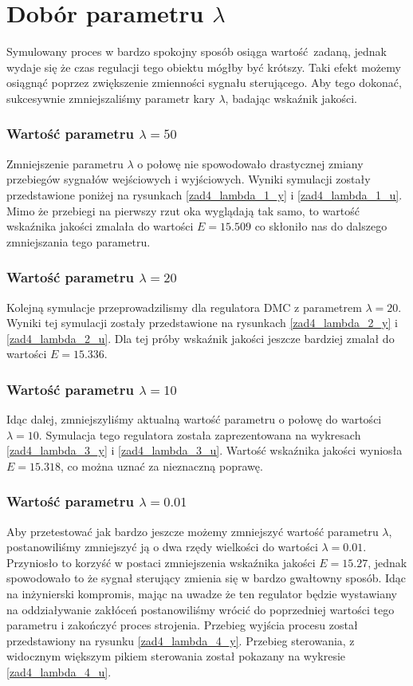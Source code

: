 \section{Dobór parametru $\lambda$}
Symulowany proces w bardzo spokojny sposób osiąga wartość zadaną, jednak wydaje się że czas regulacji
tego obiektu mógłby być krótszy. Taki efekt możemy osiągnąć poprzez zwiększenie zmienności
sygnału sterującego. Aby tego dokonać, sukcesywnie zmniejszaliśmy parametr kary $\lambda$, 
badając wskaźnik jakości.

\subsubsection{Wartość parametru $\lambda = \num{50}$}
Zmniejszenie parametru $\lambda$ o połowę nie spowodowało drastycznej zmiany przebiegów sygnałów
wejściowych i wyjściowych. Wyniki symulacji zostały przedstawione poniżej na rysunkach \ref{zad4_lambda_1_y}
i \ref{zad4_lambda_1_u}. Mimo że przebiegi na pierwszy rzut oka wyglądają tak samo, to wartość 
wskaźnika jakości zmalała do wartości $E = \num{15,509}$ co skłoniło nas do dalszego zmniejszania
tego parametru.

\subsubsection{Wartość parametru $\lambda = \num{20}$}
Kolejną symulacje przeprowadzilismy dla regulatora DMC z parametrem $\lambda = \num{20}$. Wyniki tej
symulacji zostały przedstawione na rysunkach \ref{zad4_lambda_2_y} i \ref{zad4_lambda_2_u}. Dla tej 
próby wskaźnik jakości jeszcze bardziej zmalał do wartości $E = \num{15,336}$.

\subsubsection{Wartość parametru $\lambda = \num{10}$}
Idąc dalej, zmniejszyliśmy aktualną wartość parametru o połowę do wartości $\lambda = \num{10}$. Symulacja
tego regulatora została zaprezentowana na wykresach \ref{zad4_lambda_3_y} i \ref{zad4_lambda_3_u}. Wartość wskaźnika
jakości wyniosła $E = \num{15,318}$, co można uznać za nieznaczną poprawę.

\subsubsection{Wartość parametru $\lambda = \num{0,01}$}
Aby przetestować jak bardzo jeszcze możemy zmniejszyć wartość parametru $\lambda$, postanowiliśmy
zmniejszyć ją o dwa rzędy wielkości do wartości $\lambda = \num{0,01}$. Przyniosło to korzyść w postaci
zmniejszenia wskaźnika jakości $E = \num{15,27}$, jednak spowodowało to że sygnał sterujący zmienia się 
w bardzo gwałtowny sposób. Idąc na inżynierski kompromis, mając na uwadze że ten regulator będzie wystawiany
na oddziaływanie zakłóceń postanowiliśmy wrócić do poprzedniej wartości tego parametru i zakończyć proces strojenia.
Przebieg wyjścia procesu został przedstawiony na rysunku \ref{zad4_lambda_4_y}. Przebieg sterowania, z widocznym 
większym pikiem sterowania został pokazany na wykresie \ref{zad4_lambda_4_u}.

